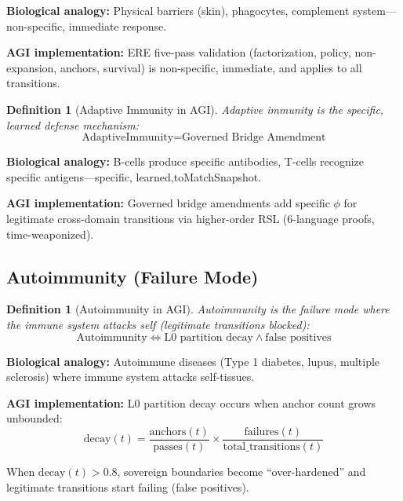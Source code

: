 \documentclass[11pt,a4paper]{article}
\newtheorem{definition}[theorem]{Definition}
\begin{document}
\textbf{Biological analogy:} Physical barriers (skin), phagocytes, complement system—non-specific, immediate response.

\textbf{AGI implementation:} ERE five-pass validation (factorization, policy, non-expansion, anchors, survival) is non-specific, immediate, and applies to all transitions.

\begin{definition}[Adaptive Immunity in AGI]
Adaptive immunity is the specific, learned defense mechanism:
\begin{equation}
\text{AdaptiveImmunity} = \text{Governed Bridge Amendment}
\end{equation}
\end{definition}

\textbf{Biological analogy:} B-cells produce specific antibodies, T-cells recognize specific antigens—specific, learned,toMatchSnapshot.

\textbf{AGI implementation:} Governed bridge amendments add specific $\phi$ for legitimate cross-domain transitions via higher-order RSL (6-language proofs, time-weaponized).

\subsection{Autoimmunity (Failure Mode)}

\begin{definition}[Autoimmunity in AGI]
Autoimmunity is the failure mode where the immune system attacks self (legitimate transitions blocked):
\begin{equation}
\text{Autoimmunity} \iff \text{L0 partition decay} \land \text{false positives}
\end{equation}
\end{definition}

\textbf{Biological analogy:} Autoimmune diseases (Type 1 diabetes, lupus, multiple sclerosis) where immune system attacks self-tissues.

\textbf{AGI implementation:} L0 partition decay occurs when anchor count grows unbounded:
\begin{equation}
\text{decay}(t) = \frac{\text{anchors}(t)}{\text{passes}(t)} \times \frac{\text{failures}(t)}{\text{total\_transitions}(t)}
\end{equation}

When $\text{decay}(t) > 0.8$, sovereign boundaries become ``over-hardened'' and legitimate transitions start failing (false positives).
\end{document}
